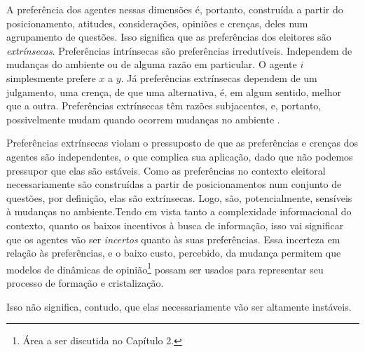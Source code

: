 A preferência dos agentes nessas dimensões é, portanto, construída a partir do
posicionamento, atitudes, considerações, opiniões e crenças, deles num
agrupamento de questões. Isso significa que as preferências dos eleitores são
\textit{extrínsecas}. Preferências intrínsecas são preferências irredutíveis.
Independem de mudanças do ambiente ou de alguma razão em particular. O agente
\(i\) simplesmente prefere \(x\) a \(y\). Já preferências extrínsecas dependem
de um julgamento, uma crença, de que uma alternativa, é, em algum sentido, melhor
que a outra. Preferências extrínsecas têm razões subjacentes, e, portanto,
possivelmente mudam quando ocorrem mudanças no ambiente \cite{liu2010wright,
  binmore2008rational}.

Preferências extrínsecas violam o pressuposto de que as preferências e crenças
dos agentes são independentes, o que complica sua aplicação, dado que não
podemos pressupor que elas são estáveis. Como as preferências no contexto
eleitoral necessariamente são construídas a partir de posicionamentos num
conjunto de questões, por definição, elas são extrínsecas. Logo, são,
potencialmente, sensíveis à mudanças no ambiente.Tendo em vista tanto a
complexidade informacional do contexto, quanto os baixos incentivos à busca de
informação, isso vai significar que os agentes vão ser \textit{incertos} quanto
às suas preferências. Essa incerteza em relação às preferências, e o baixo
custo, percebido, da mudança permitem que modelos de dinâmicas de
opinião\footnote{Área a ser discutida no Capítulo 2.} possam ser usados para
representar seu processo de formação e cristalização.




Isso não significa, contudo, que elas necessariamente vão ser altamente
instáveis.


